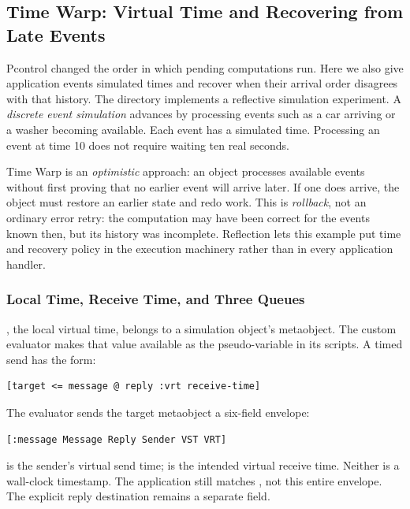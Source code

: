 \subsection{Time Warp: Virtual Time and Recovering from Late Events}
\label{sec:timewarp}

Pcontrol changed the order in which pending computations run. Here we
also give application events simulated times and recover when their
arrival order disagrees with that history.
The  directory implements a reflective
simulation experiment. A \emph{discrete event simulation} advances by
processing events such as a car arriving or a washer becoming available.
Each event has a simulated time. Processing an event at time 10 does
not require waiting ten real seconds.

Time Warp is an \emph{optimistic} approach: an object processes available
events without first proving that no earlier event will arrive later.
If one does arrive, the object must restore an earlier state and redo
work. This is \emph{rollback}, not an ordinary error retry: the computation
may have been correct for the events known then, but its history was
incomplete. Reflection lets this example put time and recovery policy
in the execution machinery rather than in every application handler.

\subsubsection{Local Time, Receive Time, and Three Queues}

, the local virtual time, belongs to a simulation object's
metaobject. The custom evaluator makes that value available as the
pseudo-variable  in its scripts. A timed send has the form:

\begin{lstlisting}
[target <= message @ reply :vrt receive-time]
\end{lstlisting}

The evaluator sends the target metaobject a six-field envelope:

\begin{lstlisting}
[:message Message Reply Sender VST VRT]
\end{lstlisting}

 is the sender's virtual send time;  is the
intended virtual receive time. Neither is a wall-clock timestamp.
The application still matches , not this entire envelope.
The explicit reply destination remains a separate field.

